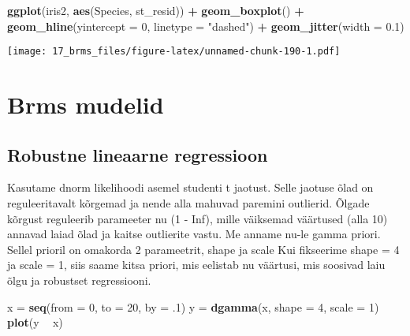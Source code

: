 \documentclass[]{article}
\newenvironment{Shaded}{\begin{snugshade}}{\end{snugshade}}
\newcommand{\KeywordTok}[1]{\textcolor[rgb]{0.13,0.29,0.53}{\textbf{#1}}}
\newcommand{\DataTypeTok}[1]{\textcolor[rgb]{0.13,0.29,0.53}{#1}}
\newcommand{\DecValTok}[1]{\textcolor[rgb]{0.00,0.00,0.81}{#1}}
\newcommand{\FloatTok}[1]{\textcolor[rgb]{0.00,0.00,0.81}{#1}}
\newcommand{\StringTok}[1]{\textcolor[rgb]{0.31,0.60,0.02}{#1}}
\newcommand{\OperatorTok}[1]{\textcolor[rgb]{0.81,0.36,0.00}{\textbf{#1}}}
\newcommand{\NormalTok}[1]{#1}
\begin{document}
\begin{Shaded}
\begin{Highlighting}[]
\KeywordTok{ggplot}\NormalTok{(iris2, }\KeywordTok{aes}\NormalTok{(Species, st_resid)) }\OperatorTok{+}\StringTok{ }
\StringTok{  }\KeywordTok{geom_boxplot}\NormalTok{() }\OperatorTok{+}
\StringTok{  }\KeywordTok{geom_hline}\NormalTok{(}\DataTypeTok{yintercept =} \DecValTok{0}\NormalTok{, }\DataTypeTok{linetype =} \StringTok{"dashed"}\NormalTok{) }\OperatorTok{+}
\StringTok{  }\KeywordTok{geom_jitter}\NormalTok{(}\DataTypeTok{width =} \FloatTok{0.1}\NormalTok{)}
\end{Highlighting}
\end{Shaded}

\texttt{[image: 17\_brms\_files/figure-latex/unnamed-chunk-190-1.pdf]}

\section{Brms mudelid}\label{brms-mudelid}

\subsection{Robustne lineaarne
regressioon}\label{robustne-lineaarne-regressioon}

Kasutame dnorm likelihoodi asemel studenti t jaotust. Selle jaotuse õlad
on reguleeritavalt kõrgemad ja nende alla mahuvad paremini outlierid.
Õlgade kõrgust reguleerib parameeter nu (1 - Inf), mille väiksemad
väärtused (alla 10) annavad laiad õlad ja kaitse outlierite vastu. Me
anname nu-le gamma priori. Sellel prioril on omakorda 2 parameetrit,
shape ja scale Kui fikseerime shape = 4 ja scale = 1, siis saame kitsa
priori, mis eelistab nu väärtusi, mis soosivad laiu õlgu ja robustset
regressiooni.

\begin{Shaded}
\begin{Highlighting}[]
\NormalTok{x =}\StringTok{ }\KeywordTok{seq}\NormalTok{(}\DataTypeTok{from =} \DecValTok{0}\NormalTok{, }\DataTypeTok{to =} \DecValTok{20}\NormalTok{, }\DataTypeTok{by =}\NormalTok{ .}\DecValTok{1}\NormalTok{)}
\NormalTok{y =}\StringTok{ }\KeywordTok{dgamma}\NormalTok{(x, }\DataTypeTok{shape =} \DecValTok{4}\NormalTok{, }\DataTypeTok{scale =} \DecValTok{1}\NormalTok{)}
\KeywordTok{plot}\NormalTok{(y }\OperatorTok{~}\StringTok{ }\NormalTok{x)}
\end{Highlighting}
\end{Shaded}
\end{document}
